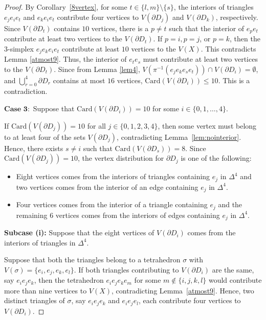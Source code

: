 \documentclass[11pt]{amsart}
\numberwithin{equation}{section}
\theoremstyle{definition}
\newcommand{\D}{\Delta}
\begin{document}
\begin{proof}
By Corollary~\ref{8vertex}, for some $t \in \{l, m\} \setminus \{s\}$, the interiors of triangles $e_j e_i e_t$ and $e_k e_i e_t$ contribute four vertices to $V(\partial D_j)$ and $V(\partial D_k)$, respectively. Since $V(\partial D_t)$ contains $10$ vertices, there is a $p\neq t$ such that the interior of $e_pe_t$ contribute at least two vertices to the $V(\partial D_t)$. If $p=i,p=j$, or $p=k$, then the $3$-simplex $e_je_ke_ie_t$ contribute at least $10$ vertices to the $V(X)$. This contradicts Lemma \ref{atmost9}. Thus, the interior of $e_te_s$ must contribute at least two vertices to the $V(\partial D_t)$. Since from Lemma \ref{lem4}, $V(\pi^{-1}(e_je_ke_se_t))\cap V(\partial D_i)=\emptyset $, and $\bigcup_{r=0}^{4}\partial D_r$ contains at most $16$ vertices, $\mathrm{Card}(V(\partial D_i))\leq 10$. This is a contradiction.



$\textbf{Case 3}:$ Suppose that $\mathrm{Card}(V(\partial D_i)) = 10$ for some $i\in \{0,1,\ldots,4\}$. 

If $\mathrm{Card}(V(\partial D_j)) = 10$ for all $j \in \{0,1,2,3,4\}$, then some vertex must belong to at least four of the sets $V(\partial D_j)$, contradicting Lemma~\ref{lem:nointerior}. Hence, there exists $s \ne i$ such that $\mathrm{Card}(V(\partial D_s)) = 8$. Since $\mathrm{Card}(V(\partial D_j)) = 10$, the vertex distribution for $\partial D_j$ is one of the following:
\begin{itemize}
    \item [(i)] Eight vertices comes from the interiors of triangles containing $e_j$ in $\D^4$ and two vertices comes from the interior of an edge containing $e_j$ in $\D^4$.

    \item [(ii)] Four vertices comes from the interior of a triangle containing $e_j$ and the remaining $6$ vertices comes from the interiors of  edges containing $e_j$ in $\D^4$.
\end{itemize}

\textbf{Subcase (i):} Suppose that the  eight vertices of $V(\partial D_i)$ comes from the interiors of triangles in $\D^4$.  


Suppose that both the triangles belong to a tetrahedron $\sigma$ with $V(\sigma) = \{e_i, e_j, e_k, e_l\}$.  
If both triangles contributing to $V(\partial D_i)$ are the same, say $e_i e_j e_k$, then the  tetrahedron $e_i e_j e_k e_m$ for some $m \notin \{i,j,k,l\}$ would contribute more than nine vertices to $V(X)$, contradicting Lemma~\ref{atmost9}.  
Hence, two distinct triangles of $\sigma$, say $e_i e_j e_k$ and $e_i e_j e_l$, each contribute four vertices to $V(\partial D_i)$.


\end{proof}
\end{document}
